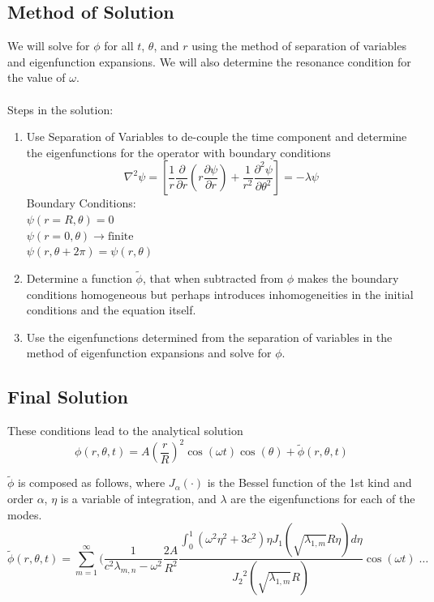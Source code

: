 \documentclass{homework}
\begin{document}
\subsection{Method of Solution}
We will solve for $\phi$ for all $t$, $\theta$, and $r$ using the method of separation of variables and eigenfunction expansions. We will also determine the resonance condition for the value of $\omega$. 
\\ \\
\noindent Steps in the solution:
\begin{enumerate}
    \item Use Separation of Variables to de-couple the time component and determine the eigenfunctions for the operator with boundary conditions
    \[ \nabla^2 \psi = \left[ \frac{1}{r} \frac{\partial}{\partial r} \left(r \frac{\partial \psi}{\partial r}\right) + \frac{1}{r^2} \frac{\partial^2 \psi}{\partial \theta^2} \right] = - \lambda \psi \]
    \noindent Boundary Conditions: \\
    $ \psi(r=R, \theta) = 0 $ \\
    $ \psi(r=0, \theta) \rightarrow \textrm{finite} $ \\
    $ \psi(r, \theta + 2\pi) = \psi(r, \theta) $ \\
    \item Determine a function $\tilde{\phi}$, that when subtracted from $\phi$ makes the boundary conditions homogeneous but perhaps introduces inhomogeneities in the initial conditions and the equation itself.
    \item Use the eigenfunctions determined from the separation of variables in the method of eigenfunction expansions and solve for $\phi$.
\end{enumerate} 

\newpage
\subsection{Final Solution}
\noindent These conditions lead to the analytical solution 
$$ \phi(r, \theta, t) = A \left(\frac{r}{R} \right)^2 \cos(\omega t) \cos(\theta) + \tilde{\phi} (r, \theta, t)$$ 

\noindent $\tilde{\phi}$ is composed as follows, where $J_\alpha (\cdot)$ is the Bessel function of the 1st kind and order $\alpha$, $\eta$ is a variable of integration, and $\lambda$ are the eigenfunctions for each of the modes.
$$ \tilde{\phi} (r, \theta, t) = \sum_{m=1}^\infty \Biggl( \frac{1}{c^2 \lambda_{m,n} - \omega^2} \frac{2A}{R^2} \frac{\int_0^1 \left( \omega^2 \eta^2 + 3c^2 \right) \eta J_1\left( \sqrt{\lambda_{1,m}} R \eta \right) d\eta }{{J_2}^2 \left( \sqrt{\lambda_{1,m}} R \right)} \cos(\omega t) \; \dots $$
\end{document}
